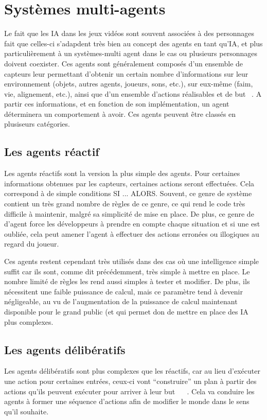 \documentclass[asi]{picINSA}
\begin{document}
\chapter{Systèmes multi-agents}
Le fait que les IA dans les jeux vidéos sont souvent associées à des personnages fait que celles-ci s'adapdent très bien au concept des agents en tant qu'IA, et plus particulièrement à un systèmes-multi agent dans le cas ou plusieurs personnages doivent coexister.
Ces agents sont généralement composés d'un ensemble de capteurs leur permettant d'obtenir un certain nombre d'informations sur leur environnement (objets, autres agents, joueurs, sons, etc.), sur eux-même (faim, vie, alignement, etc.), ainsi que d'un ensemble d'actions réalisables et de but ~\cite{IntelAgents4CompGames}. A partir ces informations, et en fonction de son implémentation, un agent déterminera un comportement à avoir.
Ces agents peuvent être classés en plusiseurs catégories.

\section{Les agents réactif}
Les agents réactifs sont la version la plus simple des agents. Pour certaines informations obtenues par les capteurs, certaines actions seront effectuées. Cela correspond à de simple conditions SI ... ALORS. Souvent, ce genre de système contient un très grand nombre de règles de ce genre, ce qui rend le code très difficile à maintenir, malgré sa simplicité de mise en place. De plus, ce genre de d'agent force les développeurs à prendre en compte chaque situation et si une est oubliée, cela peut amener l'agent à effectuer des actions erronées ou illogiques au regard du joueur.

Ces agents restent cependant très utilisés dans des cas où une intelligence simple suffit car ils sont, comme dit précédemment, très simple à mettre en place. Le nombre limité de règles les rend aussi simples à tester et modifier.
De plus, ils nécessitent une faible puissance de calcul, mais ce paramètre tend à devenir négligeable, au vu de l'augmentation de la puissance de calcul maintenant disponible pour le grand public (et qui permet don de mettre en place des IA plus complexes.

\section{Les agents délibératifs}
Les agents délibératifs sont plus complexes que les réactifs, car au lieu d'exécuter une action pour certaines entrées, ceux-ci vont ``construire'' un plan à partir des actions qu'ils peuvent exécuter pour arriver à leur but ~\cite{IntelAgents4CompGames} ~\cite{IntelAgentsInCompGames}. Cela va conduire les agents à former une séquence d'actions afin de modifier le monde dans le sens qu'il souhaite.
\end{document}

